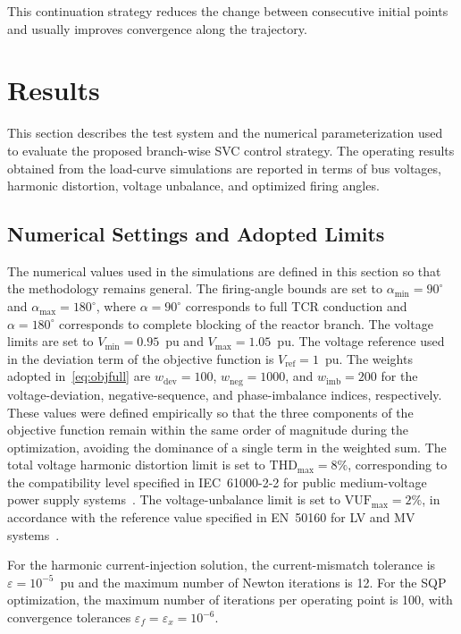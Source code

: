 \documentclass[journal]{IEEEtran}
\begin{document}
\noindent This continuation strategy reduces the change between consecutive
initial points and usually improves convergence along the trajectory.

\section{Results}
\label{sec:results}

This section describes the test system and the numerical parameterization
used to evaluate the proposed branch-wise SVC control strategy. The operating
results obtained from the load-curve simulations are reported in terms of bus
voltages, harmonic distortion, voltage unbalance, and optimized firing angles.

\subsection{Numerical Settings and Adopted Limits}
\label{subsec:numerical_settings}

The numerical values used in the simulations are defined in this section so
that the methodology remains general. The firing-angle bounds are set to
$\alpha_{\min}=90^\circ$ and $\alpha_{\max}=180^\circ$, where
$\alpha=90^\circ$ corresponds to full TCR conduction and
$\alpha=180^\circ$ corresponds to complete blocking of the reactor branch.
The voltage limits are set to
$V_{\min}=0.95$~pu and $V_{\max}=1.05$~pu. The voltage reference used in the
deviation term of the objective function is $V_{\mathrm{ref}}=1$~pu. The
weights adopted in~\eqref{eq:objfull} are
$w_{\mathrm{dev}}=100$, $w_{\mathrm{neg}}=1000$, and
$w_{\mathrm{imb}}=200$ for the voltage-deviation, negative-sequence, and
phase-imbalance indices, respectively. These values were defined
empirically so that the three components of the objective function remain
within the same order of magnitude during the optimization, avoiding the
dominance of a single term in the weighted sum. The total voltage harmonic
distortion limit is set to $\mathrm{THD}_{\max}=8\%$, corresponding to the
compatibility level specified in IEC~61000-2-2 for public medium-voltage power
supply systems~\cite{IEC61000_2_2}. The voltage-unbalance limit is set to
$\mathrm{VUF}_{\max}=2\%$, in accordance with the reference value specified
in EN~50160 for LV and MV systems~\cite{EN50160}.

For the harmonic current-injection solution, the current-mismatch tolerance
is $\varepsilon=10^{-5}$~pu and the maximum number of Newton iterations is
12. For the SQP optimization, the maximum number of iterations per operating
point is 100, with convergence tolerances
$\varepsilon_f=\varepsilon_x=10^{-6}$.
\end{document}
